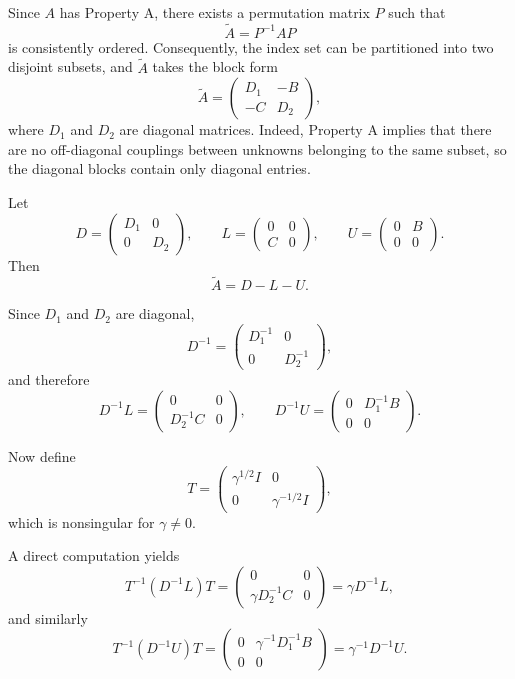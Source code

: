 \documentclass{ctexart}
\begin{document}
\begin{solution}
  Since $A$ has Property A, there exists a permutation matrix $P$ such that
  \[
    \widetilde A=P^{-1}AP
  \]
  is consistently ordered. Consequently, the index set can be partitioned
  into two disjoint subsets, and $\widetilde A$ takes the block form
  \[
    \widetilde A=
    \begin{pmatrix}
      D_1 & -B\\
      -C & D_2
    \end{pmatrix},
  \]
  where $D_1$ and $D_2$ are diagonal matrices. Indeed, Property A implies
  that there are no off-diagonal couplings between unknowns belonging to
  the same subset, so the diagonal blocks contain only diagonal entries.

  Let
  \[
    D=
    \begin{pmatrix}
      D_1&0\\
      0&D_2
    \end{pmatrix},
    \qquad
    L=
    \begin{pmatrix}
      0&0\\
      C&0
    \end{pmatrix},
    \qquad
    U=
    \begin{pmatrix}
      0&B\\
      0&0
    \end{pmatrix}.
  \]
  Then
  \[
    \widetilde A=D-L-U.
  \]

  Since $D_1$ and $D_2$ are diagonal,
  \[
    D^{-1}=
    \begin{pmatrix}
      D_1^{-1}&0\\
      0&D_2^{-1}
    \end{pmatrix},
  \]
  and therefore
  \[
    D^{-1}L=
    \begin{pmatrix}
      0&0\\
      D_2^{-1}C&0
    \end{pmatrix},
    \qquad
    D^{-1}U=
    \begin{pmatrix}
      0&D_1^{-1}B\\
      0&0
    \end{pmatrix}.
  \]

  Now define
  \[
    T=
    \begin{pmatrix}
      \gamma^{1/2}I&0\\
      0&\gamma^{-1/2}I
    \end{pmatrix},
  \]
  which is nonsingular for $\gamma\neq0$.

  A direct computation yields
  \[
    T^{-1}(D^{-1}L)T
    =
    \begin{pmatrix}
      0&0\\
      \gamma D_2^{-1}C&0
    \end{pmatrix}
    =
    \gamma D^{-1}L,
  \]
  and similarly
  \[
    T^{-1}(D^{-1}U)T
    =
    \begin{pmatrix}
      0&\gamma^{-1}D_1^{-1}B\\
      0&0
    \end{pmatrix}
    =
    \gamma^{-1}D^{-1}U.
  \]


\end{solution}
\end{document}
